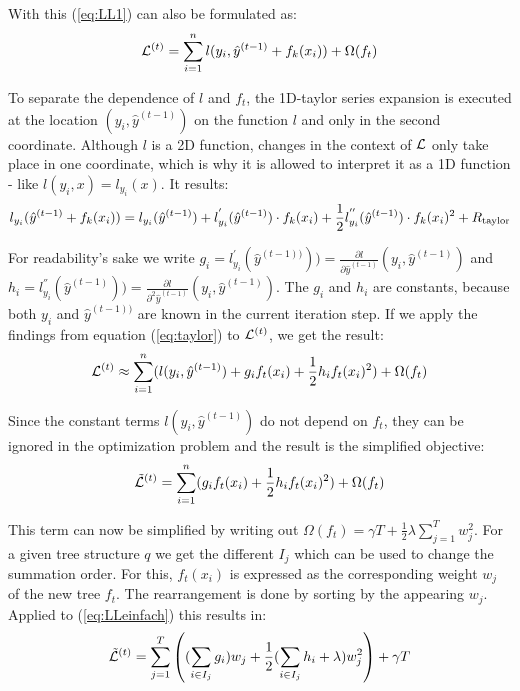 With this (\ref{eq:LL1}) can also be formulated as:
\begin{equation}
\mathcal{L}^{(t)} = \sum_{i=1}^{n} l(y_i, \hat{y}^{(t-1)} + f_k(x_i)) + \Omega(f_t)
\label{eq:LL2}
\end{equation}

To separate the dependence of $l$ and $f_t$, the 1D-taylor series expansion is executed at the location $(y_i,\hat{y}^{(t-1)})$ on the function $l$ and only in the second coordinate. Although $l$ is a 2D function, changes in the context of $\mathcal{L}$ only take place in one coordinate, which is why it is allowed to interpret it as a 1D function - like $l(y_i,x) = l_{y_i}(x)$. It results:
\begin{equation}
\label{eq:taylor}
l_{y_i}(\hat{y}^{(t-1)} + f_k(x_i)) = l_{y_i}(\hat{y}^{(t-1)}) + l_{y_i}^{'}(\hat{y}^{(t-1)}) \cdot f_k(x_i)
+ \newline \frac{1}{2} l_{y_i}^{''}(\hat{y}^{(t-1)}) \cdot f_k(x_i)^2 + R_\text{taylor}
\end{equation}

For readability's sake we write $g_i = l_{y_i}^{'}(\hat{y}^{(t-1))}) ) = \frac{\partial l}{\partial \hat{y}^{(t-1)}}(y_i,\hat{y}^{(t-1)})$ and $h_i = l_{y_i}^{''}(\hat{y}^{(t-1)}) ) = \frac{\partial l}{\partial^2 \hat{y}^{(t-1)}}(y_i,\hat{y}^{(t-1)})$. The $g_i$ and $h_i$ are constants, because both $y_i$ and $\hat{y}^{(t-1))}$ are known in the current iteration step. If we apply the findings from equation (\ref{eq:taylor}) to $\mathcal{L}^{(t)}$, we get the result:
\begin{equation} \label{eq:shortL}
\mathcal{L}^{(t)} \approx \sum_{i=1}^{n} (l(y_i,\hat{y}^{(t-1)}) + g_if_t(x_i) + \frac{1}{2} h_i f_t(x_i)^2) + \Omega(f_t)
\end{equation}

Since the constant terms $l(y_i,\hat{y}^{(t-1)})$ do not depend on $f_t$, they can be ignored in the optimization problem and the result is the simplified objective:
\begin{equation} \label{eq:LLeinfach}
\tilde{\mathcal{L}}^{(t)} = \sum_{i=1}^{n}( g_if_t(x_i) + \frac{1}{2} h_i f_t(x_i)^2) + \Omega(f_t)
\end{equation}

This term can now be simplified by writing out $\Omega(f_t) = \gamma T + \frac{1}{2}\lambda \sum_{j=1}^{T} w_j^2$. For a given tree structure $q$ we get the different $I_j$ which can be used to change the summation order. For this, $f_t(x_i)$ is expressed as the corresponding weight $w_j$ of the new tree $f_t$. The rearrangement is done by sorting by the appearing $w_j$. Applied to (\ref{eq:LLeinfach}) this results in:
\begin{equation} \label{eq:LL_umsortiert}
\tilde{\mathcal{L}}^{(t)} = \sum_{j=1}^T\left( (\sum_{i \in I_j} g_i) w_j + \frac{1}{2} (\sum_{i \in I_j} h_i + \lambda)w_j^2 \right) + \gamma T
\end{equation}

